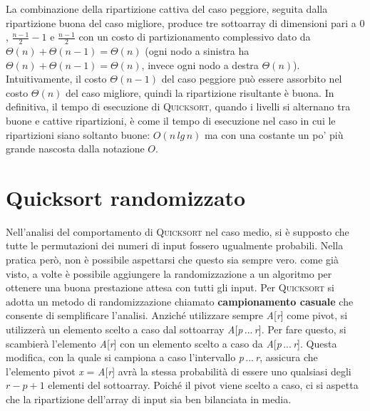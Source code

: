 \documentclass[10pt, a4paper]{report}
\begin{document}
La combinazione della ripartizione cattiva del caso peggiore, seguita dalla ripartizione buona del caso migliore, produce tre sottoarray di dimensioni pari a $0$, $\frac{n - 1}{2} - 1$ e $\frac{n - 1}{2}$ con un costo di partizionamento complessivo dato da $\Theta(n) + \Theta(n - 1) = \Theta(n)$ (ogni nodo a sinistra ha $\Theta(n) + \Theta(n - 1) = \Theta(n)$, invece ogni nodo a destra $\Theta(n)$). Intuitivamente, il costo $\Theta(n - 1)$ del caso peggiore può essere assorbito nel costo $\Theta(n)$ del caso migliore, quindi la ripartizione risultante è buona. In definitiva, il tempo di esecuzione di \textsc{Quicksort}, quando i livelli si alternano tra buone e cattive ripartizioni, è come il tempo di esecuzione nel caso in cui le ripartizioni siano soltanto buone: $O(n\,lg\,n)$ ma con una costante un po' più grande nascosta dalla notazione $O$.
\section{Quicksort randomizzato}
Nell'analisi del comportamento di \textsc{Quicksort} nel caso medio, si è supposto che tutte le permutazioni dei numeri di input fossero  ugualmente probabili. Nella pratica però, non è possibile aspettarsi che questo sia sempre vero. come già visto, a volte è possibile aggiungere la randomizzazione a un algoritmo per ottenere una buona prestazione attesa con tutti gli input. Per \textsc{Quicksort} si adotta un metodo di randomizzazione chiamato \textbf{campionamento casuale} che consente di semplificare l'analisi. Anziché utilizzare sempre \textit{A}[\textit{r}] come pivot, si utilizzerà un elemento scelto a caso dal sottoarray \textit{A}[\textit{p}\,...\,\textit{r}]. Per fare questo, si scambierà l'elemento \textit{A}[\textit{r}] con un elemento scelto a caso da \textit{A}[\textit{p}\,...\,\textit{r}]. Questa modifica, con la quale si campiona a caso l'intervallo \textit{p}\,...\,\textit{r}, assicura che l'elemento pivot \textit{x} = \textit{A}[\textit{r}] avrà la stessa probabilità di essere uno qualsiasi degli $r - p + 1$ elementi del sottoarray. Poiché il pivot viene scelto a caso, ci si aspetta che la ripartizione dell'array di input sia ben bilanciata in media.
\end{document}
